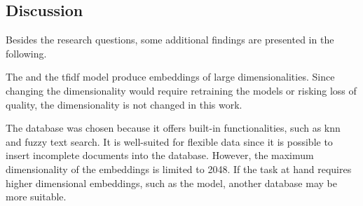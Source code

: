 \subsection{Discussion}\label{subsec:discussion}











Besides the research questions, some additional findings are presented in the following.

The \infersent{} and the \ac{tfidf} model produce embeddings of large dimensionalities.
Since changing the dimensionality would require retraining the models 
or risking loss of quality, the dimensionality is not changed in this work.

The database \databaseName{} was chosen because it offers built-in functionalities,
such as \ac{knn} and fuzzy text search.
It is well-suited for flexible data since it is possible to insert 
incomplete documents into the database.
However, the maximum dimensionality of the embeddings is limited to 2048.
If the task at hand requires higher dimensional embeddings, such as the \infersent{} model, 
another database may be more suitable.